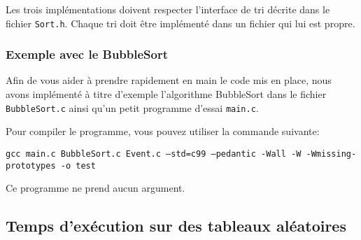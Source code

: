 \documentclass[a4paper,10pt]{article}
\begin{document}
Les trois implémentations doivent respecter l'interface de tri décrite dans le
fichier \texttt{Sort.h}. Chaque tri doit être implémenté dans un fichier qui lui
est propre.

\subsubsection*{Exemple avec le BubbleSort}

Afin de vous aider à prendre rapidement en main le code mis en place, nous avons
implémenté à titre d'exemple l'algorithme BubbleSort dans le fichier
\texttt{BubbleSort.c} ainsi qu'un petit programme d'essai \texttt{main.c}.

Pour compiler le programme, vous pouvez utiliser la commande suivante:

{\small \texttt{gcc main.c BubbleSort.c Event.c --std=c99 --pedantic -Wall -W -Wmissing-prototypes -o test}}

Ce programme ne prend aucun argument.



\subsection{Temps d'exécution sur des tableaux aléatoires}
\end{document}
